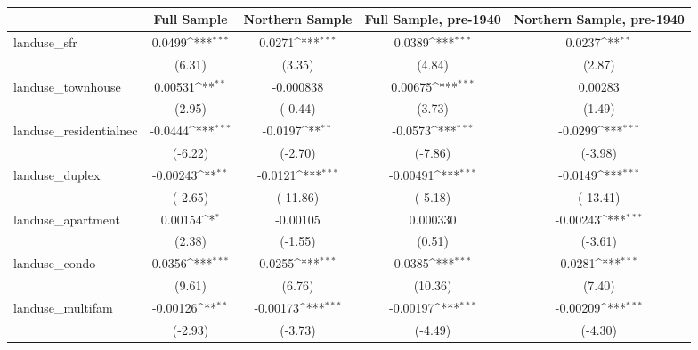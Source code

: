 \begin{table}[htbp]\centering
\def\sym#1{\ifmmode^{#1}\else\(^{#1}\)\fi}
\caption{ \label{tab1}}
\begin{tabular}{l*{4}{c}}
\toprule
                    &\multicolumn{1}{c}{Full Sample}&\multicolumn{1}{c}{Northern Sample}&\multicolumn{1}{c}{Full Sample, pre-1940}&\multicolumn{1}{c}{Northern Sample, pre-1940}\\
\midrule
landuse\_sfr         &      0.0499\sym{***}&      0.0271\sym{***}&      0.0389\sym{***}&      0.0237\sym{**} \\
                    &      (6.31)         &      (3.35)         &      (4.84)         &      (2.87)         \\
\addlinespace
landuse\_townhouse   &     0.00531\sym{**} &   -0.000838         &     0.00675\sym{***}&     0.00283         \\
                    &      (2.95)         &     (-0.44)         &      (3.73)         &      (1.49)         \\
\addlinespace
landuse\_residentialnec&     -0.0444\sym{***}&     -0.0197\sym{**} &     -0.0573\sym{***}&     -0.0299\sym{***}\\
                    &     (-6.22)         &     (-2.70)         &     (-7.86)         &     (-3.98)         \\
\addlinespace
landuse\_duplex      &    -0.00243\sym{**} &     -0.0121\sym{***}&    -0.00491\sym{***}&     -0.0149\sym{***}\\
                    &     (-2.65)         &    (-11.86)         &     (-5.18)         &    (-13.41)         \\
\addlinespace
landuse\_apartment   &     0.00154\sym{*}  &    -0.00105         &    0.000330         &    -0.00243\sym{***}\\
                    &      (2.38)         &     (-1.55)         &      (0.51)         &     (-3.61)         \\
\addlinespace
landuse\_condo       &      0.0356\sym{***}&      0.0255\sym{***}&      0.0385\sym{***}&      0.0281\sym{***}\\
                    &      (9.61)         &      (6.76)         &     (10.36)         &      (7.40)         \\
\addlinespace
landuse\_multifam    &    -0.00126\sym{**} &    -0.00173\sym{***}&    -0.00197\sym{***}&    -0.00209\sym{***}\\
                    &     (-2.93)         &     (-3.73)         &     (-4.49)         &     (-4.30)         \\

\end{tabular}
\end{table}

